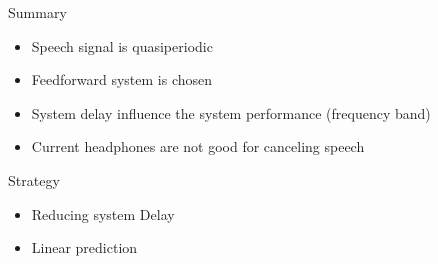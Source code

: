 \begin{frame}{Summary}
	\begin{center}		
	\begin{itemize}
		\item Speech signal is quasiperiodic 
		\item Feedforward system is chosen
		\item System delay influence the system performance (frequency band)
		\item Current headphones are not good for canceling speech
	\end{itemize}
	\end{center}	
\end{frame}

\begin{frame}{Strategy}
	\begin{center}
	\begin{itemize}
		\item Reducing system Delay 
		\item Linear prediction
	\end{itemize}
	\end{center}
\end{frame}

\begin{frame}

\end{frame}